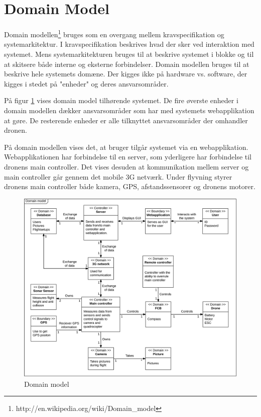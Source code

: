 \section{Domain Model}

Domain modellen\footnote{http://en.wikipedia.org/wiki/Domain\_model} bruges som en overgang mellem kravspecifikation og systemarkitektur. 
I kravspecifikation beskrives hvad der sker ved interaktion med systemet. Mens systemarkitekturen bruges til at beskrive systemet i blokke og til at skitsere både interne og eksterne forbindelser. Domain modellen bruges til at beskrive hele systemets domæne. Der kigges ikke på hardware vs. software, der kigges i stedet på "enheder" og deres ansvarsområder.

På figur \ref{fig:domain_model} vises domain model tilhørende systemet. De fire øverste enheder i domain modellen dækker ansvarsområder som har med systemets webapplikation at gøre. De resterende enheder er alle tilknyttet ansvarsområder der omhandler dronen.

På domain modellen vises det, at bruger tilgår systemet via en webapplikation. Webapplikationen har forbindelse til en server, som yderligere har forbindelse til dronens main controller. Det vises desuden at kommunikation mellem server og main controller går gennem det mobile 3G netværk. Under flyvning styrer dronens main controller både kamera, GPS, afstandssensorer og dronens motorer. 


\begin{figure}[H]
	\centering
	\includegraphics[width=1.\textwidth]{Billeder/domain_model.png}
	\caption{Domain model}
	\label{fig:domain_model}
\end{figure}

